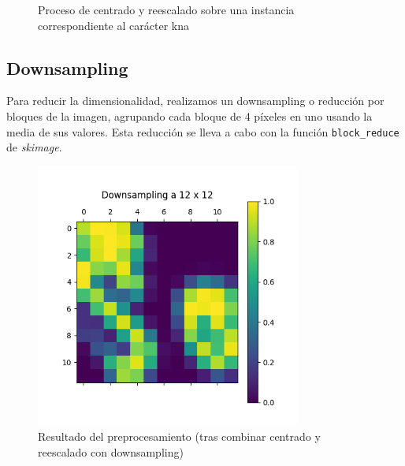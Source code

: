 \documentclass[a4]{article}
\begin{document}
\begin{figure}[H]
  \caption{Proceso de centrado y reescalado sobre una instancia correspondiente al carácter kna}
  \label{fig:centerAndResize}
\end{figure}

\subsection{Downsampling}

Para reducir la dimensionalidad, realizamos un downsampling o
reducción por bloques de la imagen, agrupando cada bloque de 4
píxeles en uno usando la media de sus valores. Esta reducción se lleva
a cabo con la función \texttt{block\_reduce} de \textit{skimage}.


\begin{figure}[H]
  \centering
  \includegraphics[width=87mm]{imgs/downsampling.png}
  \caption{Resultado del preprocesamiento (tras combinar centrado y reescalado con downsampling)}
  \label{fig:downsampling}
\end{figure}
\end{document}
